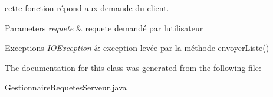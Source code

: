 cette fonction répond aux demande du client. 


\begin{DoxyParams}{Parameters}
{\em requete} & requete demandé par l\textquotesingle{}utilisateur \\
\hline
\end{DoxyParams}

\begin{DoxyExceptions}{Exceptions}
{\em I\+O\+Exception} & exception levée par la méthode envoyer\+Liste() \\
\hline
\end{DoxyExceptions}


The documentation for this class was generated from the following file\+:\begin{DoxyCompactItemize}
\item 
Gestionnaire\+Requetes\+Serveur.\+java\end{DoxyCompactItemize}
